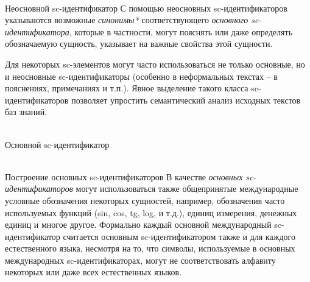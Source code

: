 \begin{frame}{\\Неосновной sc-идентификатор}
	\topline
	\justifying
	С помощью неосновных sc-идентификаторов указываются возможные \textit{синонимы*} соответствующего \textit{основного sc-идентификатора}, которые в частности, могут пояснять или даже определять обозначаемую сущность, указывает на важные свойства этой сущности.

	\bigskip
	Для некоторых sc-элементов могут часто использоваться не только основные, но и неосновные sc-идентификаторы (особенно в неформальных текстах -- в пояснениях, примечаниях и т.п.). Явное выделение такого класса sc-идентификаторов позволяет упростить семантический анализ исходных текстов баз знаний.
\end{frame}

\begin{frame}{\\Основной sc-идентификатор}
	\topline
	\justifying
	\begin{SCn}
		\begin{scnindent}
		\end{scnindent}
	\end{SCn}
	
\end{frame}

\begin{frame}{\\Построение основных sc-идентификаторов}
	\topline
	\justifying
	В качестве \textit{основных sc-идентификаторов} могут использоваться также общепринятые международные условные обозначения некоторых сущностей, например, обозначения часто используемых функций (sin, cos, tg, log, и т.д.), единиц измерения, денежных единиц и многое другое. Формально каждый основной международный sc-идентификатор считается основным sc-идентификатором также и для каждого естественного языка, несмотря на то, что символы, используемые в основных международных sc-идентификаторах, могут не соответствовать алфавиту некоторых или даже всех естественных языков.
\end{frame}

